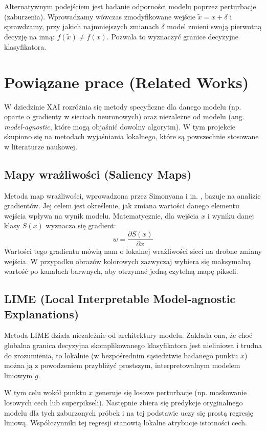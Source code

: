 \documentclass[conference]{IEEEtran}
\begin{document}
Alternatywnym podejściem jest badanie odporności modelu poprzez perturbacje (zaburzenia). Wprowadzamy wówczas zmodyfikowane wejście $\tilde{x} = x + \delta$ i sprawdzamy, przy jakich najmniejszych zmianach $\delta$ model zmieni swoją pierwotną decyzję na inną: $f(\tilde{x}) \neq f(x)$. Pozwala to wyznaczyć granice decyzyjne klasyfikatora.

\section{Powiązane prace (Related Works)}
W dziedzinie XAI rozróżnia się metody specyficzne dla danego modelu (np. oparte o gradienty w sieciach neuronowych) oraz niezależne od modelu (ang. \textit{model-agnostic}, które mogą objaśnić dowolny algorytm). W tym projekcie skupiono się na metodach wyjaśniania lokalnego, które są powszechnie stosowane w literaturze naukowej.

\subsection{Mapy wrażliwości (Saliency Maps)}
Metoda map wrażliwości, wprowadzona przez Simonyana i in. \cite{Simonyan2013}, bazuje na analizie gradientów. Jej celem jest określenie, jak zmiana wartości danego elementu wejścia wpływa na wynik modelu. Matematycznie, dla wejścia $x$ i wyniku danej klasy $S(x)$ wyznacza się gradient:
\begin{equation}
w = \frac{\partial S(x)}{\partial x}
\end{equation}
Wartości tego gradientu mówią nam o lokalnej wrażliwości sieci na drobne zmiany wejścia. W przypadku obrazów kolorowych zazwyczaj wybiera się maksymalną wartość po kanałach barwnych, aby otrzymać jedną czytelną mapę pikseli.

\subsection{LIME (Local Interpretable Model-agnostic Explanations)}
Metoda LIME \cite{Ribeiro2016} działa niezależnie od architektury modelu. Zakłada ona, że choć globalna granica decyzyjna skomplikowanego klasyfikatora jest nieliniowa i trudna do zrozumienia, to lokalnie (w bezpośrednim sąsiedztwie badanego punktu $x$) można ją z powodzeniem przybliżyć prostszym, interpretowalnym modelem liniowym $g$.

W tym celu wokół punktu $x$ generuje się losowe perturbacje (np. maskowanie losowych cech lub superpikseli). Następnie zbiera się predykcje oryginalnego modelu dla tych zaburzonych próbek i na tej podstawie uczy się prostą regresję liniową. Współczynniki tej regresji stanowią lokalne atrybucje istotności cech.
\end{document}
